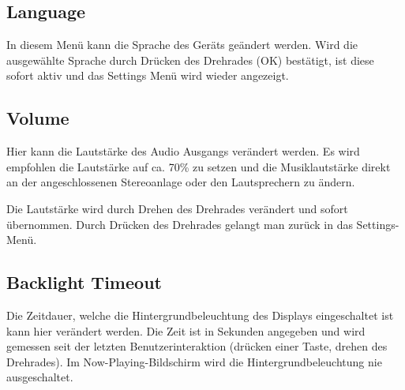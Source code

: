 \documentclass[12pt,a4paper,openany]{memoir}
\begin{document}
\subsection{Language}
In diesem Menü kann die Sprache des Geräts geändert werden. Wird die ausgewählte Sprache durch Drücken des Drehrades (OK) bestätigt, ist diese sofort aktiv und das Settings Menü wird wieder angezeigt.


\subsection{Volume}
Hier kann die Lautstärke des Audio Ausgangs verändert werden. Es wird empfohlen die Lautstärke auf ca. 70\% zu setzen und die Musiklautstärke direkt an der angeschlossenen Stereoanlage oder den Lautsprechern zu ändern. 


Die Lautstärke wird durch Drehen des Drehrades verändert und sofort übernommen. Durch Drücken des Drehrades gelangt man zurück in das Settings-Menü. 

\subsection{Backlight Timeout}
Die Zeitdauer, welche die Hintergrundbeleuchtung des Displays eingeschaltet ist kann hier verändert werden. Die Zeit ist in Sekunden angegeben und wird gemessen seit der letzten Benutzerinteraktion 
(drücken einer Taste, drehen des Drehrades). Im Now-Playing-Bildschirm wird die Hintergrundbeleuchtung nie ausgeschaltet. 

\end{document}
